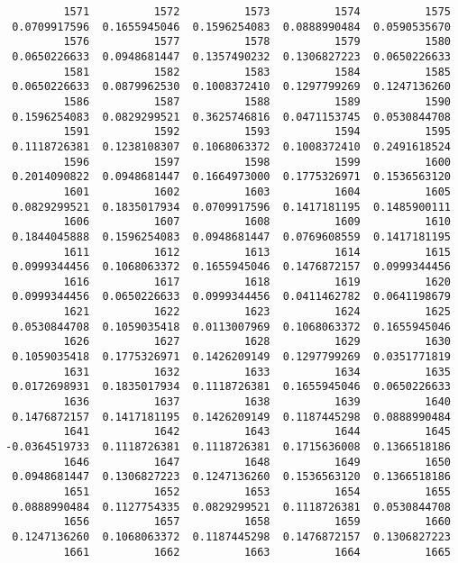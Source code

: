 \documentclass[
  letterpaper,
  DIV=11,
  numbers=noendperiod]{scrreprt}
\begin{document}
\begin{verbatim}
         1571          1572          1573          1574          1575 
 0.0709917596  0.1655945046  0.1596254083  0.0888990484  0.0590535670 
         1576          1577          1578          1579          1580 
 0.0650226633  0.0948681447  0.1357490232  0.1306827223  0.0650226633 
         1581          1582          1583          1584          1585 
 0.0650226633  0.0879962530  0.1008372410  0.1297799269  0.1247136260 
         1586          1587          1588          1589          1590 
 0.1596254083  0.0829299521  0.3625746816  0.0471153745  0.0530844708 
         1591          1592          1593          1594          1595 
 0.1118726381  0.1238108307  0.1068063372  0.1008372410  0.2491618524 
         1596          1597          1598          1599          1600 
 0.2014090822  0.0948681447  0.1664973000  0.1775326971  0.1536563120 
         1601          1602          1603          1604          1605 
 0.0829299521  0.1835017934  0.0709917596  0.1417181195  0.1485900111 
         1606          1607          1608          1609          1610 
 0.1844045888  0.1596254083  0.0948681447  0.0769608559  0.1417181195 
         1611          1612          1613          1614          1615 
 0.0999344456  0.1068063372  0.1655945046  0.1476872157  0.0999344456 
         1616          1617          1618          1619          1620 
 0.0999344456  0.0650226633  0.0999344456  0.0411462782  0.0641198679 
         1621          1622          1623          1624          1625 
 0.0530844708  0.1059035418  0.0113007969  0.1068063372  0.1655945046 
         1626          1627          1628          1629          1630 
 0.1059035418  0.1775326971  0.1426209149  0.1297799269  0.0351771819 
         1631          1632          1633          1634          1635 
 0.0172698931  0.1835017934  0.1118726381  0.1655945046  0.0650226633 
         1636          1637          1638          1639          1640 
 0.1476872157  0.1417181195  0.1426209149  0.1187445298  0.0888990484 
         1641          1642          1643          1644          1645 
-0.0364519733  0.1118726381  0.1118726381  0.1715636008  0.1366518186 
         1646          1647          1648          1649          1650 
 0.0948681447  0.1306827223  0.1247136260  0.1536563120  0.1366518186 
         1651          1652          1653          1654          1655 
 0.0888990484  0.1127754335  0.0829299521  0.1118726381  0.0530844708 
         1656          1657          1658          1659          1660 
 0.1247136260  0.1068063372  0.1187445298  0.1476872157  0.1306827223 
         1661          1662          1663          1664          1665 

\end{verbatim}
\end{document}
